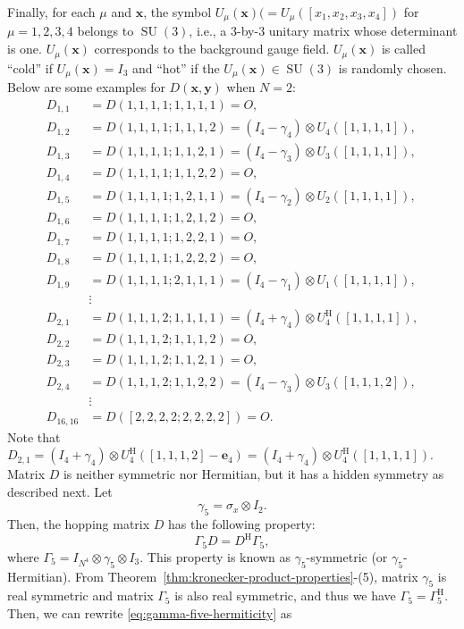 {Finally, for each $\mu$ and $\boldsymbol{x}$, the symbol $U_\mu(\boldsymbol{x})(=U_\mu([x_1,x_2,x_3,x_4])$ for $\mu=1,2,3,4$ belongs to $\operatorname{SU}(3)$, i.e., a 3-by-3 unitary matrix whose determinant is one. $U_\mu(\boldsymbol{x})$ corresponds to the background gauge field. $U_\mu(\boldsymbol{x})$ is called ``cold'' if $U_\mu(\boldsymbol{x})=I_3$ and ``hot'' if the $U_\mu(\boldsymbol{x})\in\operatorname{SU}(3)$ is randomly chosen. Below are some examples for $D(\boldsymbol{x},\boldsymbol{y})$ when $N=2$:}
\[\begin{aligned}
D_{1,1}&=D(1,1,1,1;1,1,1,1)=O,\\
D_{1,2}&=D(1,1,1,1;1,1,1,2)=(I_4-\gamma_4)\otimes U_4([1,1,1,1]),\\
D_{1,3}&=D(1,1,1,1;1,1,2,1)=(I_4-\gamma_3)\otimes U_3([1,1,1,1]),\\
D_{1,4}&=D(1,1,1,1;1,1,2,2)=O,\\
D_{1,5}&=D(1,1,1,1;1,2,1,1)=(I_4-\gamma_2)\otimes U_2([1,1,1,1]),\\
D_{1,6}&=D(1,1,1,1;1,2,1,2)=O,\\
D_{1,7}&=D(1,1,1,1;1,2,2,1)=O,\\
D_{1,8}&=D(1,1,1,1;1,2,2,2)=O,\\
D_{1,9}&=D(1,1,1,1;2,1,1,1)=(I_4-\gamma_1)\otimes U_1([1,1,1,1]),\\
&\vdots\\
D_{2,1}&=D(1,1,1,2;1,1,1,1)=(I_4+\gamma_4)\otimes U_4^{\mathrm H}([1,1,1,1]),\\
D_{2,2}&=D(1,1,1,2;1,1,1,2)=O,\\
D_{2,3}&=D(1,1,1,2;1,1,2,1)=O,\\
D_{2,4}&=D(1,1,1,2;1,1,2,2)=(I_4-\gamma_3)\otimes U_3([1,1,1,2]),\\
&\vdots\\
D_{16,16}&=D([2,2,2,2;2,2,2,2])=O.
\end{aligned}\]
{Note that $D_{2,1}=(I_4+\gamma_4)\otimes U_4^{\mathrm H}([1,1,1,2]-\boldsymbol{e}_4)=(I_4+\gamma_4)\otimes U_4^{\mathrm H}([1,1,1,1])$. Matrix $D$ is neither symmetric nor Hermitian, but it has a hidden symmetry as described next. Let}
\[\gamma_5=\sigma_x\otimes I_2.\]
{Then, the hopping matrix $D$ has the following property:}
\begin{equation}\label{eq:gamma-five-hermiticity}
\Gamma_5D=D^{\mathrm H}\Gamma_5,
\end{equation}
{where $\Gamma_5=I_{N^4}\otimes\gamma_5\otimes I_3$. This property is known as $\gamma_5$-symmetric (or $\gamma_5$-Hermitian). From Theorem\ \ref{thm:kronecker-product-properties}-(5), matrix $\gamma_5$ is real symmetric and matrix $\Gamma_5$ is also real symmetric, and thus we have $\Gamma_5=\Gamma_5^{\mathrm H}$. Then, we can rewrite \eqref{eq:gamma-five-hermiticity} as}
